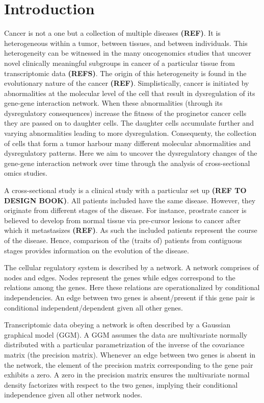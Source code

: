 \documentclass[10pt]{article}
\begin{document}
\section{Introduction}
Cancer is not a one but a collection of multiple diseases \textbf{(REF)}. It is heterogeneous within a tumor, between tissues, and between individuals. This heterogeneity can be witnessed in the many oncogenomics studies that uncover novel clinically meaningful subgroups in cancer of a particular tissue from transcriptomic data \textbf{(REFS)}. The origin of this heterogeneity is found in the evolutionary nature of the cancer \textbf{(REF)}. Simplistically, cancer is initiated by abnormalities at the molecular level of the cell that result in dysregulation of its gene-gene interaction network. When these abnormalities (through its dysregulatory consequences) increase the fitness of the proginetor cancer cells they are passed on to daughter cells. The daughter cells accumulate further and varying abnormalities leading to more dysregulation. Consequenty, the collection of cells that form a tumor harbour many different molecular abnormalities and dysregulatory patterns. Here we aim to uncover the dysregulatory changes of the gene-gene interaction network over time through the analysis of cross-sectional omics studies.

A cross-sectional study is a clinical study with a particular set up \textbf{(REF TO DESIGN BOOK)}. All patients included have the same disease. However, they originate from different stages of the disease. For instance, prostrate cancer is believed to develop from normal tissue via pre-cursor lesions to cancer after which it metastasizes \textbf{(REF)}. As such the included patients represent the course of the disease. Hence, comparison of the (traits of) patients from contiguous stages provides information on the evolution of the disease.

The cellular regulatory system is described by a network. A network comprises of nodes and edges. Nodes represent the genes while edges correspond to the relations among the genes. Here these relations are operationalized by conditional independencies. An edge between two genes is absent/present if this gene pair is conditional independent/dependent given all other genes.

Transcriptomic data obeying a network is often described by a Gaussian graphical model (GGM). A GGM assumes the data are multivariate normally  distributed with a particular parametrization of the inverse of the covariance matrix (the precision matrix). Whenever an edge between two genes is absent in the network, the element of the precision matrix corresponding to the gene pair exhibits a zero. A zero in the precision matrix ensures the multivariate normal density factorizes with respect to the two genes, implying their conditional independence given all other network nodes.
\end{document}

